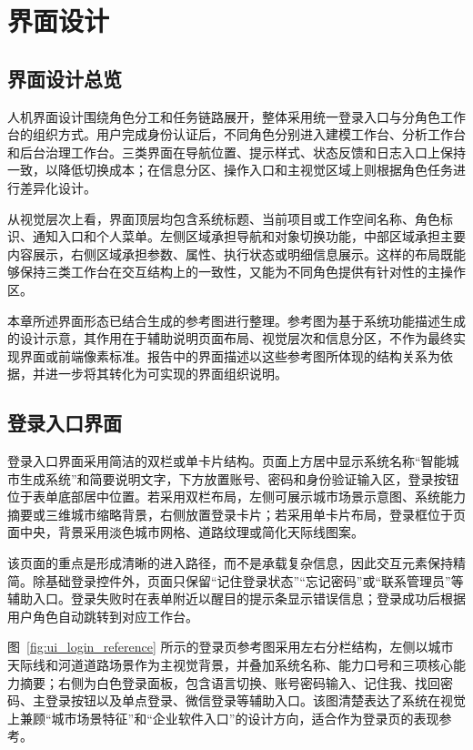 \section{界面设计}

\subsection{界面设计总览}
人机界面设计围绕角色分工和任务链路展开，整体采用统一登录入口与分角色工作台的组织方式。用户完成身份认证后，不同角色分别进入建模工作台、分析工作台和后台治理工作台。三类界面在导航位置、提示样式、状态反馈和日志入口上保持一致，以降低切换成本；在信息分区、操作入口和主视觉区域上则根据角色任务进行差异化设计。

从视觉层次上看，界面顶层均包含系统标题、当前项目或工作空间名称、角色标识、通知入口和个人菜单。左侧区域承担导航和对象切换功能，中部区域承担主要内容展示，右侧区域承担参数、属性、执行状态或明细信息展示。这样的布局既能够保持三类工作台在交互结构上的一致性，又能为不同角色提供有针对性的主操作区。

本章所述界面形态已结合生成的参考图进行整理。参考图为基于系统功能描述生成的设计示意，其作用在于辅助说明页面布局、视觉层次和信息分区，不作为最终实现界面或前端像素标准。报告中的界面描述以这些参考图所体现的结构关系为依据，并进一步将其转化为可实现的界面组织说明。

\subsection{登录入口界面}
登录入口界面采用简洁的双栏或单卡片结构。页面上方居中显示系统名称“智能城市生成系统”和简要说明文字，下方放置账号、密码和身份验证输入区，登录按钮位于表单底部居中位置。若采用双栏布局，左侧可展示城市场景示意图、系统能力摘要或三维城市缩略背景，右侧放置登录卡片；若采用单卡片布局，登录框位于页面中央，背景采用淡色城市网格、道路纹理或简化天际线图案。

该页面的重点是形成清晰的进入路径，而不是承载复杂信息，因此交互元素保持精简。除基础登录控件外，页面只保留“记住登录状态”“忘记密码”或“联系管理员”等辅助入口。登录失败时在表单附近以醒目的提示条显示错误信息；登录成功后根据用户角色自动跳转到对应工作台。

图~\ref{fig:ui_login_reference} 所示的登录页参考图采用左右分栏结构，左侧以城市天际线和河道道路场景作为主视觉背景，并叠加系统名称、能力口号和三项核心能力摘要；右侧为白色登录面板，包含语言切换、账号密码输入、记住我、找回密码、主登录按钮以及单点登录、微信登录等辅助入口。该图清楚表达了系统在视觉上兼顾“城市场景特征”和“企业软件入口”的设计方向，适合作为登录页的表现参考。

